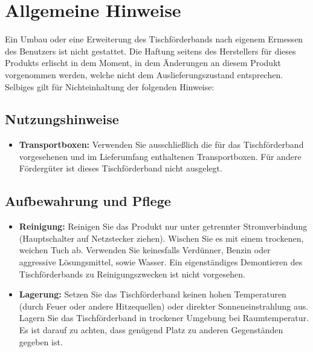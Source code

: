 %
%

\chapter{Allgemeine Hinweise}
Ein Umbau oder eine Erweiterung des Tischförderbands nach eigenem Ermessen des Benutzers ist nicht gestattet. Die Haftung seitens des Herstellers für dieses Produkts erlischt in dem Moment, in dem Änderungen an diesem Produkt vorgenommen werden, welche nicht dem Auslieferungszustand entsprechen. Selbiges gilt für Nichteinhaltung der folgenden Hinweise:

\section{Nutzungshinweise}
\begin{itemize}

	\item \textbf {Transportboxen:}
	Verwenden Sie ausschließlich die für das Tischförderband vorgesehenen und im Lieferumfang enthaltenen Transportboxen. Für andere Fördergüter ist dieses Tischförderband nicht ausgelegt.
	
\end{itemize}

\section{Aufbewahrung und Pflege}
\begin{itemize}
	\item \textbf {Reinigung:}
	Reinigen Sie das Produkt nur unter getrennter Stromverbindung (Hauptschalter auf  Netzstecker ziehen). Wischen Sie es mit einem trockenen, weichen Tuch ab. Verwenden Sie keinesfalls Verdünner, Benzin oder aggressive Lösungsmittel, sowie Wasser. Ein eigenständiges Demontieren des Tischförderbands zu Reinigungszwecken ist nicht vorgesehen.
	
	\item \textbf {Lagerung:}
	Setzen Sie das Tischförderband keinen hohen Temperaturen (durch Feuer oder andere Hitzequellen) oder direkter Sonneneinstrahlung aus. Lagern Sie das Tischförderband in trockener Umgebung bei Raumtemperatur. Es ist darauf zu achten, dass genügend Platz zu anderen Gegenständen gegeben ist. 

\end{itemize}

